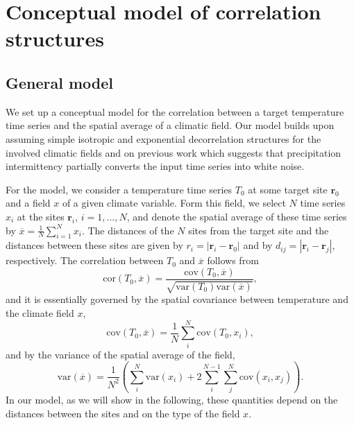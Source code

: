 \documentclass[cp, manuscript]{copernicus}
\begin{document}
\section{Conceptual model of correlation structures}
\label{app:concept.model}

\subsection{General model}
\label{app:concept.model.general}

We set up a conceptual model for the correlation between a target temperature
time series and the spatial average of a climatic field. Our model builds upon
assuming simple isotropic and exponential decorrelation structures for the
involved climatic fields and on previous work which suggests that precipitation
intermittency partially converts the input time series into white noise.

For the model, we consider a temperature time series $T_0$ at some target site
$\mathbf{r}_0$ and a field $x$ of a given climate variable. Form this field, we
select $N$ time series $x_i$ at the sites $\mathbf{r}_i$, $i=1,\dotsc,N$, and
denote the spatial average of these time series by
$\overline{x}=\frac{1}{N}\sum_{i=1}^{N}{x_i}$. The distances of the $N$ sites
from the target site and the distances between these sites are given by
$r_i=|\mathbf{r}_i-\mathbf{r}_0|$ and by $d_{ij}=|{\mathbf{r}_i-\mathbf{r}_j}|$,
respectively. The correlation between $T_0$ and $\overline{x}$ follows from
%
\begin{equation}
\label{eq:corr.general}
\mathrm{cor}(T_0,\overline{x})=\frac
{\mathrm{cov}(T_0,\overline{x})}
{\sqrt{\mathrm{var}(T_0)\mathrm{var}(\overline{x})}},
\end{equation}
and it is essentially governed by the spatial covariance between temperature and
the climate field $x$,
%
\begin{equation}
\label{eq:cov.general}
\mathrm{cov}(T_0,\overline{x})=
\frac{1}{N}\sum_{i}^{N}{\mathrm{cov}(T_0,x_i)},
\end{equation}
%
and by the variance of the spatial average of the field,
\begin{equation}
\label{eq:var.general}
\mathrm{var}(\overline{x})=
\frac{1}{N^2}\left(
\sum_{i}^{N}{\mathrm{var}(x_i)} +
2\sum_{i}^{N-1}\sum_{j}^{N}{\mathrm{cov}(x_i,x_j)}
\right).
\end{equation}
%
In our model, as we will show in the following, these quantities depend on the
distances between the sites and on the type of the field $x$.
\end{document}
